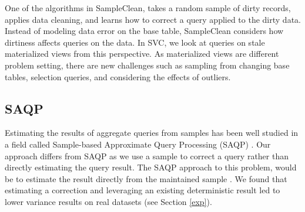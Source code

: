One of the algorithms in SampleClean, takes a random sample of dirty records, applies data cleaning, and learns how to correct a query applied to the dirty data.
Instead of modeling data error on the base table, SampleClean considers how dirtiness affects queries on the data.
In SVC, we look at queries on stale materialized views from this perspective.
As materialized views are different problem setting, there are new challenges such as sampling from changing base tables, selection queries, and considering the effects of outliers.

\subsection{SAQP}
Estimating the results of aggregate queries from samples has been
well studied in a field called Sample-based Approximate Query Processing
(SAQP) \cite{OlkenR86,AgarwalMPMMS13}.
Our approach differs from SAQP as we use a sample to correct a query rather than directly estimating the query result.
The SAQP approach to this problem, would be to
estimate the result directly from the maintained sample \cite{joshi2008materialized}.
We found that estimating
a correction and leveraging an existing deterministic result led
to lower variance results on real datasets (see Section \ref{exp}). 


